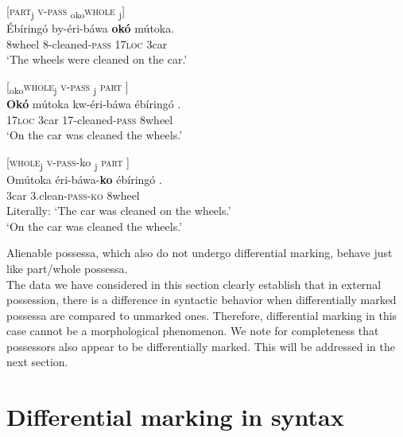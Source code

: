 \documentclass[output=paper]{langscibook}
\begin{document}
\ex \label{ex:schneider:PartWholePass}
\begin{xlist}

\ex \label{ex:schneider:PartPass}
[\textsc{part}\textsubscript{j} {  } \textsc{v-pass} {  } \textsubscript{oko}\textsc{whole} {  } \underline{\hspace{0.5cm}}\textsubscript{j}] \\
\gll \'Ebíring\'o by-\'eri-báwa \textbf{ok\'o} mútoka.  \\
8wheel 8-cleaned-\textsc{pass} \textsc{17loc} 3car\\
\glt `The wheels were cleaned on the car.' 

\ex \label{ex:schneider:OKOWholePass}
[\textsubscript{oko}\textsc{whole}\textsubscript{j} {  } \textsc{v-pass} {  } \underline{\hspace{0.5cm}}\textsubscript{j} {  } \textsc{part} ] \\
\gll \textbf{Ok\'o} mútoka kw-\'eri-báwa \'ebíring\'o  .  \\
\textsc{17loc} 3car 17-cleaned-\textsc{pass} 8wheel \\
\glt `On the car was cleaned the wheels.' 

\ex \label{ex:schneider:WholeVPassko}
[\textsc{whole}\textsubscript{j} {  } \textsc{v-pass}-ko {  } \underline{\hspace{0.5cm}}\textsubscript{j} {  } \textsc{part} ] \\
\gll Omútoka \'eri-báwa-\textbf{ko} \'ebíring\'o .  \\
3car 3.clean-\textsc{pass}-\textsc{ko} 8wheel \\
\glt Literally: `The car was cleaned on the wheels.' \\
`On the car was cleaned the wheels.'

\end{xlist}

\z

\noindent Alienable possessa, which also do not undergo differential marking, behave just like part/whole possessa. \\
\indent The data we have considered in this section clearly establish that in external possession, there is a difference in syntactic behavior when differentially marked possessa are compared to unmarked ones. Therefore, differential marking in this case cannot be a morphological phenomenon. We note for completeness that possessors also appear to be differentially marked. This will be addressed in the next section. 


\section{Differential marking in syntax}\label{sec:schneider:section5}
\end{document}
